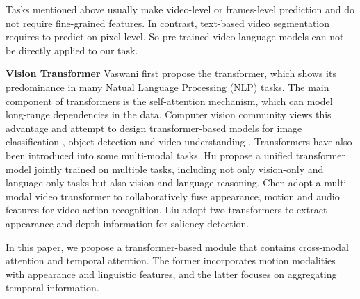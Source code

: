\documentclass[10pt,twocolumn,letterpaper]{article}
\begin{document}
Tasks mentioned above usually make video-level or frames-level prediction and do not require fine-grained features. In contrast, text-based video segmentation requires to predict on pixel-level. So pre-trained video-language models can not be directly applied to our task.










\noindent\textbf{Vision Transformer} Vaswani \etal \cite{vaswani2017attention} first propose the transformer, which shows its predominance in many Natual Language Processing (NLP) tasks. The main component of transformers is the self-attention mechanism, which can model long-range dependencies in the data. Computer vision community views this advantage and attempt to design transformer-based models for image classification \cite{dosovitskiy2020image, Yang2020Distill, liu2021swin, yuan2021tokens, metaformer}, object detection \cite{carion2020end, zhu2020deformable} and video understanding \cite{arnab2021vivit, bertasius2021space}. Transformers have also been introduced into some multi-modal tasks. Hu \etal \cite{hu2021unit} propose a unified transformer model jointly trained on multiple tasks, including not only vision-only and language-only tasks but also vision-and-language reasoning. Chen \etal \cite{chen2021mm} adopt a multi-modal video transformer to collaboratively fuse appearance, motion and audio features for video action recognition. Liu \etal \cite{liu2021visual} adopt two transformers to extract appearance and depth information for saliency detection. 


In this paper, we propose a transformer-based module that contains cross-modal attention and temporal attention. The former incorporates motion modalities with appearance and linguistic features, and the latter focuses on aggregating temporal information.





\vspace{-3mm}
\end{document}
